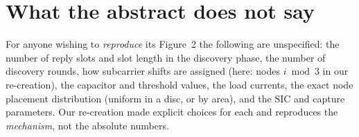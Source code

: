 \section{What the abstract does not say}

For anyone wishing to \emph{reproduce} its Figure~2 the following are unspecified: the number of reply slots and slot length in the discovery phase, the number of discovery rounds, how subcarrier shifts are assigned (here: nodes $i\bmod 3$ in our re-creation), the capacitor and threshold values, the load currents, the exact node placement distribution (uniform in a disc, or by area), and the SIC and capture parameters. Our re-creation made explicit choices for each and reproduces the \emph{mechanism}, not the absolute numbers.
